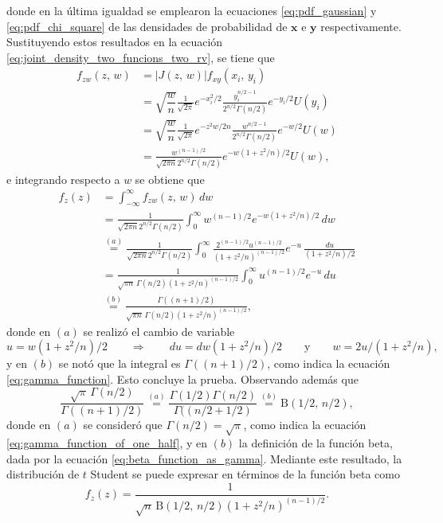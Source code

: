 \documentclass[a4paper]{report}
\newcommand{\x}{\mathbf{x}}
\newcommand{\y}{\mathbf{y}}
\begin{document}
donde en la última igualdad se emplearon la ecuaciones \ref{eq:pdf_gaussian} y \ref{eq:pdf_chi_square} de las densidades de probabilidad de \(\x\) e \(\y\) respectivamente. Sustituyendo estos resultados en la ecuación \ref{eq:joint_density_two_funcions_two_rv}, se tiene que
\begin{align*}
 f_{zw}(z,\,w)&=|J(z,\,w)|f_{xy}(x_i,\,y_i)\\
   &=\sqrt{\dfrac{w}{n}}\frac{1}{\sqrt{2\pi}}e^{-x_i^2/2}\frac{y_i^{n/2-1}}{2^{n/2}\Gamma(n/2)}e^{-y_i/2}U(y_i)\\
   &=\sqrt{\dfrac{w}{n}}\frac{1}{\sqrt{2\pi}}e^{-z^2w/2n}\frac{w^{n/2-1}}{2^{n/2}\Gamma(n/2)}e^{-w/2}U(w)\\
   &=\frac{w^{(n-1)/2}}{\sqrt{2\pi n}2^{n/2}\Gamma(n/2)}e^{-w(1+z^2/n)/2}U(w),
\end{align*}
e integrando respecto a \(w\) se obtiene que
\begin{align*}
 f_z(z)&=\int_{-\infty}^\infty f_{zw}(z,\,w)\,dw\\
  &=\frac{1}{\sqrt{2\pi n}2^{n/2}\Gamma(n/2)}\int_0^\infty w^{(n-1)/2}e^{-w(1+z^2/n)/2}\,dw\\
  &\overset{(a)}{=}\frac{1}{\sqrt{2\pi n}2^{n/2}\Gamma(n/2)}\int_0^\infty \frac{2^{(n-1)/2}u^{(n-1)/2}}{(1+z^2/n)^{(n-1)/2}}e^{-u}\,\frac{du}{(1+z^2/n)/2}\\
  &=\frac{1}{\sqrt{\pi n}\,\Gamma(n/2)(1+z^2/n)^{(n-1)/2}}\int_0^\infty u^{(n-1)/2}e^{-u}\,du\\
  &\overset{(b)}{=}\frac{\Gamma((n+1)/2)}{\sqrt{\pi n}\,\Gamma(n/2)(1+z^2/n)^{(n-1)/2}},
\end{align*}
donde en \((a)\) se realizó el cambio de variable 
\[
 u=w(1+z^2/n)/2\qquad\Rightarrow\qquad du=dw(1+z^2/n)/2\qquad\textrm{y}\qquad w=2u/(1+z^2/n),
\]
y en \((b)\) se notó que la integral es \(\Gamma((n+1)/2)\), como indica la ecuación \ref{eq:gamma_function}. Esto concluye la prueba.
Observando además que 
\[
 \frac{\sqrt{\pi}\,\Gamma(n/2)}{\Gamma((n+1)/2)}\overset{(a)}{=}\frac{\Gamma(1/2)\Gamma(n/2)}{\Gamma((n/2+1/2)}\overset{(b)}{=}\mathrm{B}(1/2,\,n/2),
\]
donde en \((a)\) se consideró que \(\Gamma(n/2)=\sqrt{\pi}\), como indica la ecuación \ref{eq:gamma_function_of_one_half}, y en \((b)\) la definición de la función beta, dada por la ecuación \ref{eq:beta_function_as_gamma}. Mediante este resultado, la distribución de \(t\) Student se puede expresar en términos de la función beta como
\begin{equation}\label{eq:t_student_distribution_beta}
 f_z(z)=\frac{1}{\sqrt{n}\,\mathrm{B}(1/2,\,n/2)(1+z^2/n)^{(n-1)/2}}.
\end{equation}
\end{document}
